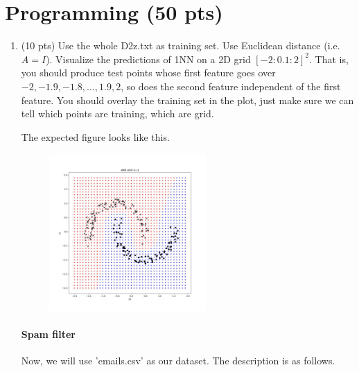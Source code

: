 \documentclass[a4paper]{article}
\theoremstyle{definition}
\begin{document}
\section{Programming (50 pts)}
\begin{enumerate}
	\item (10 pts) Use the whole D2z.txt as training set.  Use Euclidean distance (i.e. $A=I$).
	Visualize the predictions of 1NN on a 2D grid $[-2:0.1:2]^2$.
	That is, you should produce test points whose first feature goes over $-2, -1.9, -1.8, \ldots, 1.9, 2$, so does the second feature independent of the first feature.
	You should overlay the training set in the plot, just make sure we can tell which points are training, which are grid.
	
	The expected figure looks like this.
	\begin{figure}[H]
		\centering
		\includegraphics[width=6cm]{q2q1.jpg}
	\end{figure}
	
	\paragraph{Spam filter} Now, we will use 'emails.csv' as our dataset. The description is as follows.
	

\end{enumerate}
\end{document}
